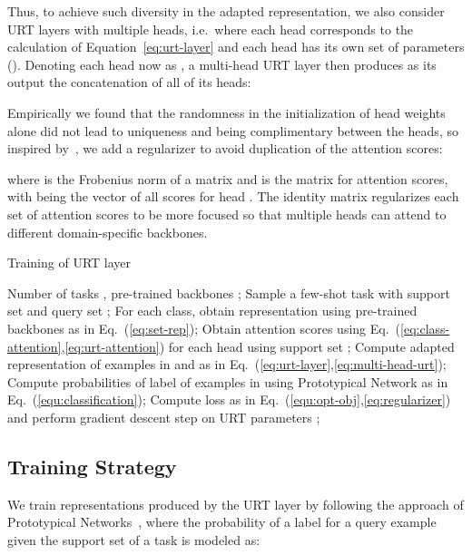 \documentclass{article}
\begin{document}
Thus, to achieve such diversity in the adapted representation,  we also consider URT layers with multiple heads, i.e.\ where each head corresponds to the calculation of Equation~\ref{eq:urt-layer} and each head has its own set of parameters (). Denoting each head now as , a multi-head URT layer then produces as its output the concatenation of all of its heads:

Empirically we found that the randomness in the initialization of head weights alone did not lead to uniqueness and being complimentary between the heads, so inspired by~\citet{lin2017structured}, we add a regularizer to avoid duplication of the attention scores:

where  is the Frobenius norm of a matrix and  is the matrix for attention scores, with  being the vector of all scores  for head . The identity matrix  regularizes each set of attention scores to be more focused so that multiple heads can attend to different domain-specific backbones.




\begin{algorithm}[t]
\caption{Training of URT layer }
\label{alg:urt}
\begin{algorithmic}[1]
\REQUIRE  Number of tasks ,  pre-trained backbones ;
\FOR{}
\STATE Sample a few-shot task  with support set  and query set ;
\STATE For each class, obtain representation using  pre-trained backbones as in Eq.~(\ref{eq:set-rep});
\STATE Obtain attention scores using Eq.~(\ref{eq:class-attention},\ref{eq:urt-attention}) for each head using support set ;
\STATE Compute adapted representation of examples in  and  as in Eq.~(\ref{eq:urt-layer},\ref{eq:multi-head-urt});
\STATE Compute probabilities of label of examples in  using Prototypical Network as in Eq.~(\ref{equ:classification});
\STATE Compute loss as in Eq.~(\ref{equ:opt-obj},\ref{eq:regularizer}) and perform gradient descent step on URT parameters ;
\ENDFOR
\end{algorithmic}
\end{algorithm}


\subsection{Training Strategy}
We train representations produced by the URT layer by following the approach of Prototypical Networks~\cite{snell2017prototypical}, where the probability of a label  for a query example  given the support set of a task is modeled as:
\end{document}
